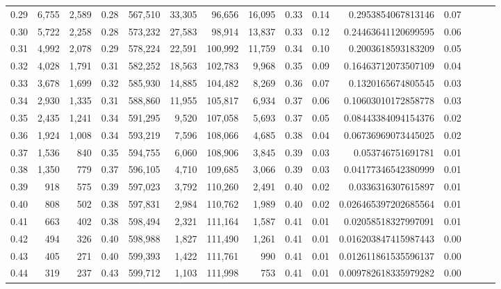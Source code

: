 \begin{tabular}{rrrrrrrrrrrrrrr}
0.29 &   6,755 &  2,589 &  0.28 &  567,510 &   33,305 &   96,656 &   16,095 &  0.33 &  0.14 &      0.2953854067813146 &      0.07 \\
0.30 &   5,722 &  2,258 &  0.28 &  573,232 &   27,583 &   98,914 &   13,837 &  0.33 &  0.12 &     0.24463641120699595 &      0.06 \\
0.31 &   4,992 &  2,078 &  0.29 &  578,224 &   22,591 &  100,992 &   11,759 &  0.34 &  0.10 &      0.2003618593183209 &      0.05 \\
0.32 &   4,028 &  1,791 &  0.31 &  582,252 &   18,563 &  102,783 &    9,968 &  0.35 &  0.09 &     0.16463712073507109 &      0.04 \\
0.33 &   3,678 &  1,699 &  0.32 &  585,930 &   14,885 &  104,482 &    8,269 &  0.36 &  0.07 &      0.1320165674805545 &      0.03 \\
0.34 &   2,930 &  1,335 &  0.31 &  588,860 &   11,955 &  105,817 &    6,934 &  0.37 &  0.06 &     0.10603010172858778 &      0.03 \\
0.35 &   2,435 &  1,241 &  0.34 &  591,295 &    9,520 &  107,058 &    5,693 &  0.37 &  0.05 &     0.08443384094154376 &      0.02 \\
0.36 &   1,924 &  1,008 &  0.34 &  593,219 &    7,596 &  108,066 &    4,685 &  0.38 &  0.04 &     0.06736969073445025 &      0.02 \\
0.37 &   1,536 &    840 &  0.35 &  594,755 &    6,060 &  108,906 &    3,845 &  0.39 &  0.03 &       0.053746751691781 &      0.01 \\
0.38 &   1,350 &    779 &  0.37 &  596,105 &    4,710 &  109,685 &    3,066 &  0.39 &  0.03 &     0.04177346542380999 &      0.01 \\
0.39 &     918 &    575 &  0.39 &  597,023 &    3,792 &  110,260 &    2,491 &  0.40 &  0.02 &      0.0336316307615897 &      0.01 \\
0.40 &     808 &    502 &  0.38 &  597,831 &    2,984 &  110,762 &    1,989 &  0.40 &  0.02 &    0.026465397202685564 &      0.01 \\
0.41 &     663 &    402 &  0.38 &  598,494 &    2,321 &  111,164 &    1,587 &  0.41 &  0.01 &     0.02058518327997091 &      0.01 \\
0.42 &     494 &    326 &  0.40 &  598,988 &    1,827 &  111,490 &    1,261 &  0.41 &  0.01 &    0.016203847415987443 &      0.00 \\
0.43 &     405 &    271 &  0.40 &  599,393 &    1,422 &  111,761 &      990 &  0.41 &  0.01 &    0.012611861535596137 &      0.00 \\
0.44 &     319 &    237 &  0.43 &  599,712 &    1,103 &  111,998 &      753 &  0.41 &  0.01 &    0.009782618335979282 &      0.00 \\

\end{tabular}
